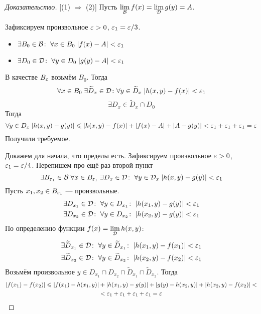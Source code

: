 \documentclass[a4paper, 12pt]{article}
\begin{document}
\begin{proof}[Доказательство]
    [(1) $\Rightarrow$ (2)] Пусть $\lim\limits_{\mathcal{B}} f(x) = \lim\limits_{\mathcal{D}} g(y) = A$. 
    \par Зафиксируем произвольное $\varepsilon > 0$, $\varepsilon_1 = \varepsilon/3$.
    \begin{itemize}
        \item $\exists B_0\in \mathcal{B}\colon\; \forall x\in B_0\; |f(x) - A| <\varepsilon_1$
        \item $\exists D_0\in \mathcal{D}\colon\; \forall y\in D_0\; |g(y) - A| <\varepsilon_1$
    \end{itemize}
    В качестве $B_\varepsilon$ возьмём $B_0$. Тогда
    $$
        \forall x\in B_0\; \exists \widetilde{D}_x \in \mathcal{D}\colon \forall y \in \widetilde{D}_x\; |h(x,y) -f(x)| < \varepsilon_1
    $$
    $$
        \exists D_x \in \widetilde{D}_x\cap D_0
    $$
    Тогда $$
    \forall y\in D_x\; |h(x,y) - g(y)| \leqslant |h(x,y) - f(x)| + |f(x) - A| + |A- g(y)| < \varepsilon_1 + \varepsilon_1 + \varepsilon_1 = \varepsilon
    $$
    Получили требуемое.
    \par [$(2) \Rightarrow (1)$] Докажем для начала, что пределы есть. Зафиксируем произвольное $\varepsilon > 0$, $\varepsilon_1 = \varepsilon/4$. Перепишем про ещё раз второй пункт
    $$
        \exists B_{\varepsilon_1} \in \mathcal{B}\; \forall x\in B_{\varepsilon_1}\; \exists D_x \in \mathcal{D}\colon\;  \forall y \in \mathcal{D}_x \; |h(x,y) - g(y)| < \varepsilon_1
    $$
    Пусть $x_1, x_2 \in B_{\varepsilon_1}$ --- произвольные.
    \begin{gather*}
        \exists D_{x_1} \in \mathcal{D}\colon \; \forall y\in D_{x_1}\colon \; |h(x_1,y) - g(y)|<\varepsilon_1\\
        \exists D_{x_2}\in \mathcal{D}\colon \; \forall y \in D_{x_2}\colon \; |h(x_2, y) - g(y)| < \varepsilon_1\\
    \end{gather*}
    По определению функции $ f(x) = \lim\limits_{\mathcal{D}} h(x, y) $: 
    \begin{gather*}
        \exists \widetilde{D}_{x_1}\in \mathcal{D}\colon \; \forall y\in \widetilde{D}_{x_1}\colon \; |h(x_1,y) - f(x_1)| < \varepsilon_1\\
        \exists \widetilde{D}_{x_2} \in \mathcal{D}\colon \; \forall y\in \widetilde{D}_{x_2}\colon \; |h(x_2,y) - f(x_2)| < \varepsilon_1\\
    \end{gather*}
    Возьмём произвольное $y\in D_{x_1} \cap D_{x_2} \cap \widetilde{D}_{x_1}\cap \widetilde{D}_{x_2}$. Тогда
    \begin{gather}
        |f(x_1) - f(x_2)| \leqslant |f(x_1) - h(x_1, y)| + |h(x_1, y) - g(y)| + |g(y) - h(x_2, y)| + |h(x_2, y) - f(x_2)|<\\ < \eps_1 + \eps_1 + \eps_1 + \eps_1 = \eps

\end{gather}
\end{proof}
\end{document}

